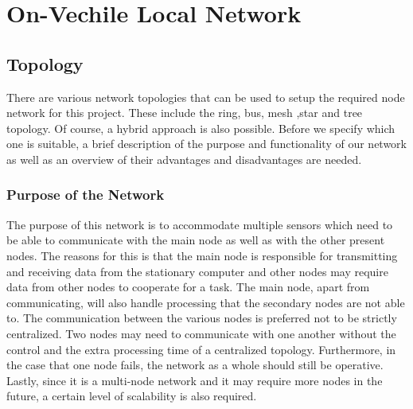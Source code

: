 \section{On-Vechile Local Network}

\subsection{Topology}

There are various network topologies that can be used to setup the required node network for this project. These include the ring, bus, mesh ,star and tree topology. Of course, a hybrid approach is also possible. Before we specify which one is suitable, a brief description of the purpose and functionality of our network as well as an overview of their advantages and disadvantages are needed. 

\subsubsection{Purpose of the Network}
The purpose of this network is to accommodate multiple sensors which need to be able to communicate with the main node as well as with the other present nodes. The reasons for this is that the main node is responsible for transmitting and receiving data from the stationary computer and other nodes may require data from other nodes to cooperate for a task. The main node, apart from communicating, will also handle processing that the secondary nodes are not able to. The communication between the various nodes is preferred not to be strictly centralized. Two nodes may need to communicate with one another without the control and the extra processing time of a centralized topology. Furthermore, in the case that one node fails, the network as a whole should still be operative. Lastly, since it is a multi-node network and it may require more nodes in the future, a certain level of scalability is also required.

